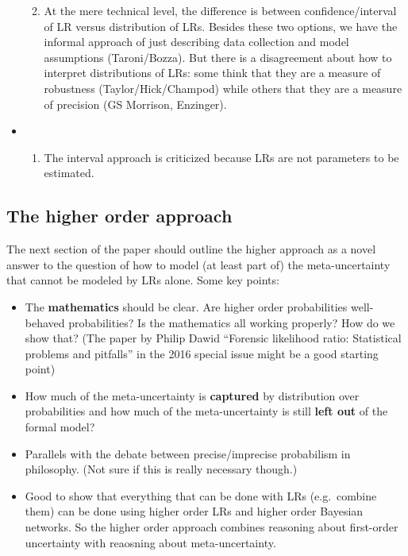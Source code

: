 \documentclass[
  10pt,
  dvipsnames,enabledeprecatedfontcommands]{scrartcl}
\providecommand{\tightlist}{%
  \setlength{\itemsep}{0pt}\setlength{\parskip}{0pt}}
\begin{document}
\begin{itemize}
\begin{enumerate}
  \def\labelenumi{(\alph{enumi})}
  \setcounter{enumi}{21}
  \tightlist
  \item
    At the mere technical level, the difference is between
    confidence/interval of LR versus distribution of LRs. Besides these
    two options, we have the informal approach of just describing data
    collection and model assumptions (Taroni/Bozza). But there is a
    disagreement about how to interpret distributions of LRs: some think
    that they are a measure of robustness (Taylor/Hick/Champod) while
    others that they are a measure of precision (GS Morrison, Enzinger).
  \end{enumerate}
\item
  \begin{enumerate}
  \def\labelenumi{(\roman{enumi})}
  \setcounter{enumi}{5}
  \tightlist
  \item
    The interval approach is criticized because LRs are not parameters
    to be estimated.
  \end{enumerate}
\end{itemize}

\hypertarget{the-higher-order-approach}{%
\subsection{The higher order approach}\label{the-higher-order-approach}}

The next section of the paper should outline the higher approach as a
novel answer to the question of how to model (at least part of) the
meta-uncertainty that cannot be modeled by LRs alone. Some key points:

\begin{itemize}
\item
  The \textbf{mathematics} should be clear. Are higher order
  probabilities well-behaved probabilities? Is the mathematics all
  working properly? How do we show that? (The paper by Philip Dawid
  ``Forensic likelihood ratio: Statistical problems and pitfalls'' in
  the 2016 special issue might be a good starting point)
\item
  How much of the meta-uncertainty is \textbf{captured} by distribution
  over probabilities and how much of the meta-uncertainty is still
  \textbf{left out} of the formal model?
\item
  Parallels with the debate between precise/imprecise probabilism in
  philosophy. (Not sure if this is really necessary though.)
\item
  Good to show that everything that can be done with LRs (e.g.~combine
  them) can be done using higher order LRs and higher order Bayesian
  networks. So the higher order approach combines reasoning about
  first-order uncertainty with reaosning about meta-uncertainty.
\end{itemize}
\end{document}
